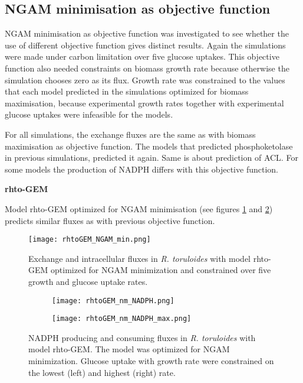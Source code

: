 \subsection{NGAM minimisation as objective function}

NGAM minimisation as objective function was investigated to see whether the use of different objective function gives distinct results. 
Again the simulations were made under carbon limitation over five glucose uptakes. This objective function also needed constraints 
on biomass growth rate because otherwise the simulation chooses zero as its flux. Growth rate was constrained to the values that each model
predicted in the simulations optimized for biomass maximisation, because experimental growth rates together with experimental glucose 
uptakes were infeasible for the models. 

For all simulations, the exchange fluxes are the same as with biomass maximisation as objective function. The models that predicted phosphoketolase 
in previous simulations, predicted it again. Same is about prediction of ACL. For some models the production of NADPH differs with this objective function.

\textbf{rhto-GEM}

Model rhto-GEM optimized for NGAM minimisation (see figures \ref{fig:rhtoGEM_NGAM_min} and \ref{fig:rhtoGEM_nm_NADPH}) predicts similar fluxes as with 
previous objective function. 

\begin{figure}[h!]
    \centering
    \texttt{[image: rhtoGEM\_NGAM\_min.png]}
    \caption{Exchange and intracellular fluxes in \textit{R. toruloides} with model rhto-GEM optimized for NGAM minimization 
    and constrained over five growth and glucose uptake rates.}
    \label{fig:rhtoGEM_NGAM_min}
\end{figure}

\begin{figure}[h!]
    \centering
    \begin{subfigure}[h!]{0.49\textwidth}
        \centering
        \texttt{[image: rhtoGEM\_nm\_NADPH.png]}
    \end{subfigure}
    \hfill
    \begin{subfigure}[h!]{0.49\textwidth}
        \centering
        \texttt{[image: rhtoGEM\_nm\_NADPH\_max.png]}
    \end{subfigure}
    \caption{NADPH producing and consuming fluxes in \textit{R. toruloides} with model rhto-GEM. The model was optimized for NGAM minimization. 
    Glucose uptake with growth rate were constrained on the lowest (left) and highest (right) rate.}
    \label{fig:rhtoGEM_nm_NADPH}
\end{figure}



